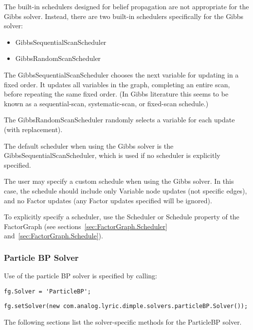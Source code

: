 
The built-in schedulers designed for belief propagation are not appropriate for the Gibbs solver.  Instead, there are two built-in schedulers specifically for the Gibbs solver:

\begin{itemize}
\item GibbsSequentialScanScheduler
\item GibbsRandomScanScheduler
\end{itemize}

The GibbsSequentialScanScheduler chooses the next variable for updating in a fixed order. It updates all variables in the graph, completing an entire scan, before repeating the same fixed order. (In Gibbs literature this seems to be known as a sequential-scan, systematic-scan, or fixed-scan schedule.)

The GibbsRandomScanScheduler randomly selects a variable for each update (with replacement).

The default scheduler when using the Gibbs solver is the GibbsSequentialScanScheduler, which is used if no scheduler is explicitly specified.

The user may specify a custom schedule when using the Gibbs solver.  In this case, the schedule should include only Variable node updates (not specific edges), and no Factor updates (any Factor updates specified will be ignored).

To explicitly specify a scheduler, use the Scheduler or Schedule property of the FactorGraph (see sections~\ref{sec:FactorGraph.Scheduler} and~\ref{sec:FactorGraph.Schedule}).


\subsubsection{Particle BP Solver}

Use of the particle BP solver is specified by calling:

\ifmatlab
\begin{lstlisting}
fg.Solver = 'ParticleBP';
\end{lstlisting}
\fi

\ifjava
\begin{lstlisting}
fg.setSolver(new com.analog.lyric.dimple.solvers.particleBP.Solver());
\end{lstlisting}
\fi

The following sections list the solver-specific methods for the ParticleBP solver.

